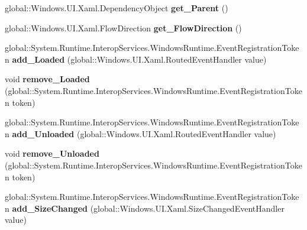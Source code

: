 \begin{DoxyCompactItemize}
global\+::\+Windows.\+U\+I.\+Xaml.\+Dependency\+Object {\bfseries get\+\_\+\+Parent} ()
\item 
\mbox{\label{interface_windows_1_1_u_i_1_1_xaml_1_1_i_framework_element_a80c91718f267bfd344d25ca8701827ab}} 
global\+::\+Windows.\+U\+I.\+Xaml.\+Flow\+Direction {\bfseries get\+\_\+\+Flow\+Direction} ()
\item 
\mbox{\label{interface_windows_1_1_u_i_1_1_xaml_1_1_i_framework_element_a09af92bc5fcaa9a8925401ddcd75d36e}} 
global\+::\+System.\+Runtime.\+Interop\+Services.\+Windows\+Runtime.\+Event\+Registration\+Token {\bfseries add\+\_\+\+Loaded} (global\+::\+Windows.\+U\+I.\+Xaml.\+Routed\+Event\+Handler value)
\item 
\mbox{\label{interface_windows_1_1_u_i_1_1_xaml_1_1_i_framework_element_aafdb3efaeb2c040c7e5209bb37317e74}} 
void {\bfseries remove\+\_\+\+Loaded} (global\+::\+System.\+Runtime.\+Interop\+Services.\+Windows\+Runtime.\+Event\+Registration\+Token token)
\item 
\mbox{\label{interface_windows_1_1_u_i_1_1_xaml_1_1_i_framework_element_ad4ed2f244c6516761d641431768f021b}} 
global\+::\+System.\+Runtime.\+Interop\+Services.\+Windows\+Runtime.\+Event\+Registration\+Token {\bfseries add\+\_\+\+Unloaded} (global\+::\+Windows.\+U\+I.\+Xaml.\+Routed\+Event\+Handler value)
\item 
\mbox{\label{interface_windows_1_1_u_i_1_1_xaml_1_1_i_framework_element_a3289e30bb0249071801645260d266744}} 
void {\bfseries remove\+\_\+\+Unloaded} (global\+::\+System.\+Runtime.\+Interop\+Services.\+Windows\+Runtime.\+Event\+Registration\+Token token)
\item 
\mbox{\label{interface_windows_1_1_u_i_1_1_xaml_1_1_i_framework_element_abf3ac37a9daffc43b7299c8aa7b02e4a}} 
global\+::\+System.\+Runtime.\+Interop\+Services.\+Windows\+Runtime.\+Event\+Registration\+Token {\bfseries add\+\_\+\+Size\+Changed} (global\+::\+Windows.\+U\+I.\+Xaml.\+Size\+Changed\+Event\+Handler value)

\end{DoxyCompactItemize}
